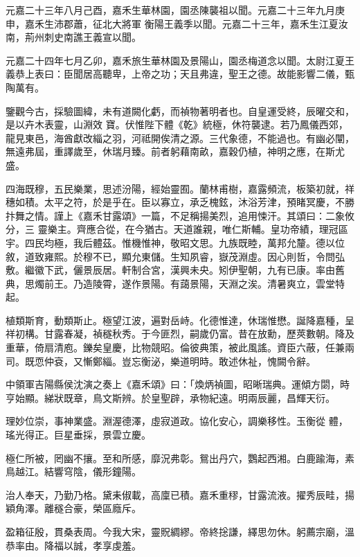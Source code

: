 \begin{pinyinscope}
 元嘉二十三年八月己酉，嘉禾生華林園，園丞陳襲祖以聞。元嘉二十三年九月庚申，嘉禾生沛郡蕭，征北大將軍
 衡陽王義季以聞。元嘉二十三年，嘉禾生江夏汝南，荊州刺史南譙王義宣以聞。



 元嘉二十四年七月乙卯，嘉禾旅生華林園及景陽山，園丞梅道念以聞。太尉江夏王義恭上表曰：臣聞居高聽卑，上帝之功；天且弗違，聖王之德。故能影響二儀，甄陶萬有。



 鑒觀今古，採驗圖緯，未有道闕化虧，而禎物著明者也。自皇運受終，辰曜交和，是以卉木表靈，山淵效
 寶。伏惟陛下體《乾》統極，休符襲逮。若乃鳳儀西郊，龍見東邑，海酋獻改緇之羽，河祗開俟清之源。三代象德，不能過也。有幽必闡，無遠弗屆，重譯歲至，休瑞月臻。前者躬藉南畝，嘉穀仍植，神明之應，在斯尤盛。



 四海既穆，五民樂業，思述汾陽，經始靈囿。蘭林甫樹，嘉露頻流，板築初就，祥穗如積。太平之符，於是乎在。臣以寡立，承乏槐鉉，沐浴芳津，預睹冥慶，不勝抃舞之情。謹上《嘉禾甘露頌》一篇，不足稱揚美烈，追用悚汗。其頌曰：二象攸分，三
 靈樂主。齊應合從，在今猶古。天道誰親，唯仁斯輔。皇功帝績，理冠區宇。四民均極，我后體茲。惟機惟神，敬昭文思。九族既睦，萬邦允釐。德以位敘，道致雍熙。於穆不已，顯允東儲。生知夙睿，嶽茂淵虛。因心則哲，令問弘敷。繼徽下武，儷景辰居。軒制合宮，漢興未央。矧伊聖朝，九有已康。率由舊典，思燭前王。乃造陵霄，遂作景陽。有藹景陽，天淵之涘。清暑爽立，雲堂特起。



 植類斯育，動類斯止。極望江波，遍對岳峙。化德惟達，休瑞惟懋。誕降嘉種，呈
 祥初構。甘露春凝，禎穟秋秀。于今匪烈，嗣歲仍富。昔在放勳，歷莢數朝。降及重華，倚扇清庖。鑠矣皇慶，比物競昭。倫彼典策，被此風謠。資臣六蔽，任兼兩司。既恧仲袞，又慚鄭緇。豈忘衡泌，樂道明時。敢述休祉，愧闕令辭。


中領軍吉陽縣侯沈演之奏上《嘉禾頌》曰：「煥炳禎圖，昭晰瑞典。運傾方閟，時亨始顯。綈狀既章，鳥文斯辨。於皇聖辟，承物紀遠。明兩辰麗，昌輝天衍。


理妙位崇，事神業盛。淵渥德澤，虛寂道政。協化安心，調樂移性。玉衡從
 體，瑤光得正。巨星垂採，景雲立慶。


極仁所被，罔幽不攘。至和所感，靡況弗彰。鴛出丹穴，鸚起西湘。白鹿踰海，素鳥越江。結響穹陰，儀形鐘陽。


治人奉天，乃勤乃格。黛耒俶載，高廩已積。嘉禾重穋，甘露流液。擢秀辰畦，揚穎角澤。離穟合豪，榮區廕斥。


盈箱征殷，貫桑表周。今我大宋，靈貺綢繆。帝終捴謙，繹思勿休。躬薦宗廟，溫恭率由。降福以誠，孝享虔羞。



\end{pinyinscope}

